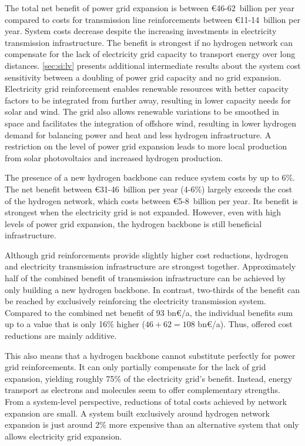 The total net benefit of power grid expansion is between \euro46-62~billion per
year compared to costs for transmission line reinforcements between
\euro11-14~billion per year. System costs decrease despite the increasing
investments in electricity transmission infrastructure. The benefit is strongest
if no hydrogen network can compensate for the lack of electricity grid capacity
to transport energy over long distances. \cref{sec:si:lv} presents additional
intermediate results about the system cost sensitivity between a doubling of
power grid capacity and no grid expansion. Electricity grid reinforcement
enables renewable resources with better capacity factors to be integrated from
further away, resulting in lower capacity needs for solar and wind. The grid
also allows renewable variations to be smoothed in space and facilitates the
integration of offshore wind, resulting in lower hydrogen demand for balancing
power and heat and less hydrogen infrastructure. A restriction on the level of
power grid expansion leads to more local production from solar photovoltaics and
increased hydrogen production.

The presence of a new hydrogen backbone can reduce system costs by up to 6\%.
The net benefit between \euro31-46~billion per year (4-6\%) largely exceeds the
cost of the hydrogen network, which costs between \euro5-8~billion per year. Its
benefit is strongest when the electricity grid is not expanded. However, even
with high levels of power grid expansion, the hydrogen backbone is still beneficial
infrastructure.

Although grid reinforcements provide slightly higher cost reductions, hydrogen and
electricity transmission infrastructure are strongest together. Approximately
half of the combined benefit of transmission infrastructure can be achieved by
only building a new hydrogen backbone. In contrast, two-thirds of the benefit
can be reached by exclusively reinforcing the electricity transmission system.
Compared to the combined net benefit of 93 bn\euro/a, the individual benefits
sum up to a value that is only 16\% higher ($46+62=108$ bn\euro/a). Thus,
offered cost reductions are mainly additive.

This also means that a hydrogen backbone cannot substitute perfectly for power
grid reinforcements. It can only partially compensate for the lack of grid
expansion, yielding roughly 75\% of the electricity grid's benefit. Instead,
energy transport as electrons and molecules seem to offer complementary
strengths. From a system-level perspective, reductions of total costs achieved
by network expansion are small. A system built exclusively around hydrogen
network expansion is just around 2\% more expensive than an alternative system
that only allows electricity grid expansion. %

